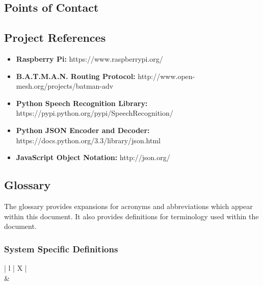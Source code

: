 \documentclass[11pt,a4paper]{article}
\begin{document}
\subsection{Points of Contact}


\subsection{Project References}
\begin{itemize}
	\item{\textbf{Raspberry Pi:}}
		\textnormal{https://www.raspberrypi.org/}
	\item{\textbf{B.A.T.M.A.N. Routing Protocol:}}
		\textnormal{http://www.open-mesh.org/projects/batman-adv}
	\item{\textbf{Python Speech Recognition Library:}}
		\textnormal{https://pypi.python.org/pypi/SpeechRecognition/}
	\item{\textbf{Python JSON Encoder and Decoder:}}
		\textnormal{https://docs.python.org/3.3/library/json.html}
    \item{\textbf{JavaScript Object Notation:}}
        \textnormal{http://json.org/}
\end{itemize}

\subsection{Glossary}
The glossary provides expansions for acronyms and abbreviations which appear within this document. It also provides definitions for terminology used within the document. 

\subsubsection{System Specific Definitions}
\begin{center}
\begin{tabularx}{\textwidth}{ | l | X | }
	\hline
	 \\
	\hline
		& \\
	\hline
\end{tabularx}
\end{center}
\end{document}
